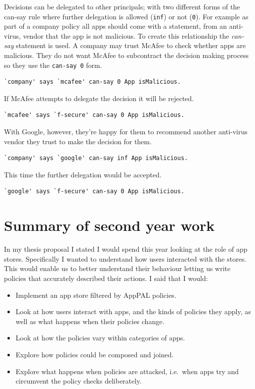 \documentclass[a4paper]{scrartcl}
\begin{document}
Decisions can be delegated to other principals; with two different forms of the can-say rule where further delegation is allowed (\lstinline{inf}) or not (\lstinline{0}).
For example as part of a company policy all apps should come with a statement, from an anti-virus, vendor that the app is not malicious.
To create this relationship the \emph{can-say} statement is used.
A company may trust McAfee to check whether apps are malicious.
They do not want McAfee to subcontract the decision making process so they use the \lstinline{can-say 0} form.
\begin{lstlisting}
`company' says `mcafee' can-say 0 App isMalicious.
\end{lstlisting}
If McAfee attempts to delegate the decision it will be rejected.
\begin{lstlisting}
`mcafee' says `f-secure' can-say 0 App isMalicious.
\end{lstlisting}
With Google, however, they're happy for them to recommend another anti-virus vendor they trust to make the decision for them.
\begin{lstlisting}
`company' says `google' can-say inf App isMalicious.
\end{lstlisting}
This time the further delegation would be accepted.
\begin{lstlisting}
`google' says `f-secure' can-say 0 App isMalicious.
\end{lstlisting}

\section{Summary of second year work}


In my thesis proposal I stated I would spend this year looking at the role of app stores.
Specifically I wanted to understand how users interacted with the stores.
This would enable us to better understand their behaviour letting us write policies that accurately described their actions.
I said that I would:
\begin{itemize}
  \item Implement an app store filtered by AppPAL policies.
  \item Look at how users interact with apps, and the kinds of policies they apply, as well as what happens when their policies change.
  \item Look at how the policies vary within categories of apps.
  \item Explore how policies could be composed and joined.
  \item Explore what happens when policies are attacked, i{.}e{.}~when apps try and circumvent the policy checks deliberately.
\end{itemize}
\end{document}

